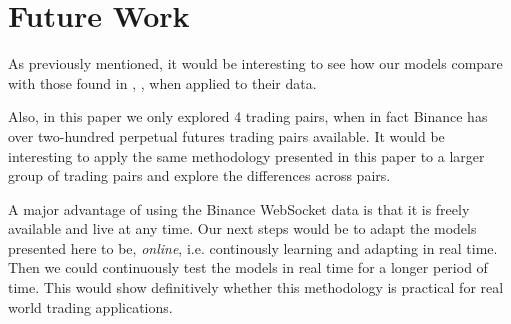 \section{Future Work}
As previously mentioned, it would be interesting to see how our models compare with those found in \cite{ZHANG2019}, \cite{KOLM2023}, \cite{LUCCHESE2024} when applied to their data.

Also, in this paper we only explored 4 trading pairs, when in fact Binance has over two-hundred perpetual futures trading pairs available.
It would be interesting to apply the same methodology presented in this paper to a larger group of trading pairs and explore
the differences across pairs.

A major advantage of using the Binance WebSocket data is that it is freely available and live at any time. Our next steps
would be to adapt the models presented here to be, \textit{online}, i.e. continously learning and adapting in real time.
Then we could continuously test the models in real time for a longer period of time. This would show definitively
whether this methodology is practical for real world trading applications.



